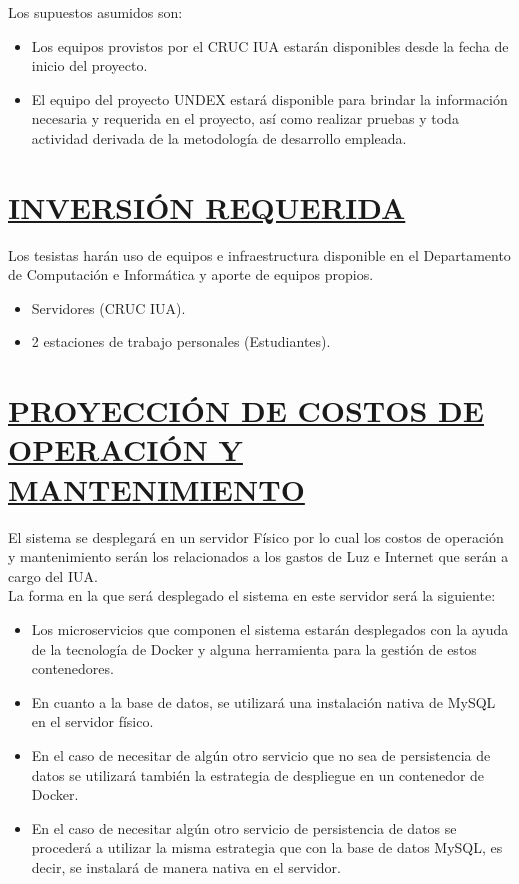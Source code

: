 Los supuestos asumidos son:
\begin{itemize}
	\item Los equipos provistos por el CRUC IUA estarán disponibles desde la fecha de inicio del proyecto.
	\item El equipo del proyecto UNDEX estará disponible para brindar la información necesaria y requerida en el proyecto, así como realizar pruebas y toda actividad derivada de la metodología de desarrollo empleada.\\
\end{itemize}


\section*{\underline{INVERSIÓN REQUERIDA}}
Los tesistas harán uso de equipos e infraestructura disponible en el Departamento de Computación e Informática y aporte de equipos propios.
\begin{itemize}
	\item Servidores (CRUC IUA).
	\item 2 estaciones de trabajo personales (Estudiantes).\\
\end{itemize}

\section*{\underline{PROYECCIÓN DE COSTOS DE OPERACIÓN Y MANTENIMIENTO}}
El sistema se desplegará en un servidor Físico por lo cual los costos de operación y mantenimiento serán los relacionados a los gastos de Luz e Internet que serán a cargo del IUA. \\

La forma en la que será desplegado el sistema en este servidor será la siguiente:
\begin{itemize}
	\item Los microservicios que componen el sistema estarán desplegados con la ayuda de la tecnología de Docker y alguna herramienta para la gestión de estos contenedores.
	\item En cuanto a la base de datos, se utilizará una instalación nativa de MySQL en el servidor físico.
	\item En el caso de necesitar de algún otro servicio que no sea de persistencia de datos se utilizará también la estrategia de despliegue en un contenedor de Docker.
	\item En el caso de necesitar algún otro servicio de persistencia de datos se procederá a utilizar la misma estrategia que con la base de datos MySQL, es decir, se instalará de manera nativa en el servidor.\\
\end{itemize}

